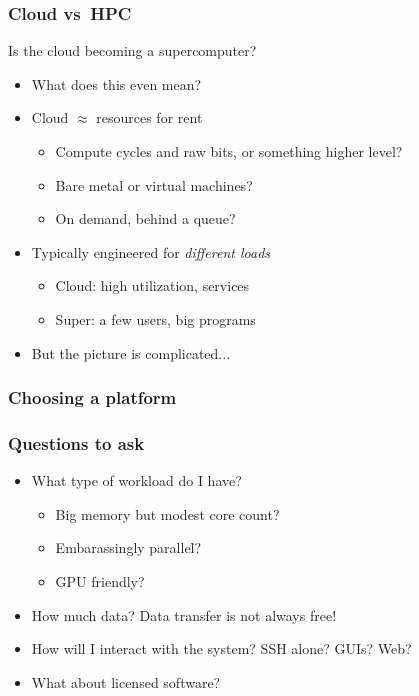 \documentclass{beamer}
\begin{document}
\begin{frame}
  \titlepage
\end{frame}


% 


\begin{frame}
  \frametitle{Cloud vs~HPC}

  Is the cloud becoming a supercomputer?
  \begin{itemize}
  \item What does this even mean?
  \item Cloud $\approx$ resources for rent
    \begin{itemize}
    \item Compute cycles and raw bits, or something higher level?
    \item Bare metal or virtual machines?
    \item On demand, behind a queue?
    \end{itemize}
  \item Typically engineered for {\em different loads}
    \begin{itemize}
    \item Cloud: high utilization, services
    \item Super: a few users, big programs
    \end{itemize}
  \item But the picture is complicated...
  \end{itemize}
\end{frame}


\begin{frame}
  \frametitle{Choosing a platform}
\end{frame}


\begin{frame}
  \frametitle{Questions to ask}

  \begin{itemize}
  \item What type of workload do I have?
    \begin{itemize}
    \item Big memory but modest core count?
    \item Embarassingly parallel?
    \item GPU friendly?
    \end{itemize}
  \item How much data?  Data transfer is not always free!
  \item How will I interact with the system?  SSH alone?  GUIs?  Web?
  \item What about licensed software?
  \end{itemize}
\end{frame}
\end{document}
